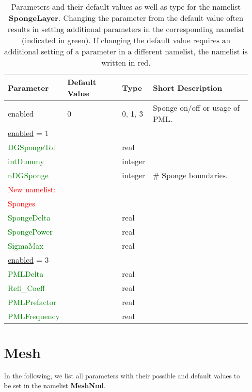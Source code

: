 \documentclass[12pt,twoside]{article}
\begin{document}
\begin{table}[H]
\caption{Parameters and their default values as well as type for the namelist \textbf{SpongeLayer}.
         Changing the parameter from the default value often results in setting additional parameters 
         in the corresponding namelist (indicated in green). 
         If changing the default value requires an additional setting of a parameter in a different namelist, 
         the namelist is written in red.}
\begin{center}
\begin{tabular}{|p{4cm}|p{2.7cm}|p{2cm}|p{4cm}|}
\hline
Parameter & Default Value & Type & Short Description \\
\hline
\hline
enabled & 0 & 0, 1, 3 & Sponge on/off or usage of PML.\\
\hdashline
\uline{enabled} = 1 & & &\\
\textcolor{green}{DGSpongeTol} &  & real & \\
\textcolor{green}{intDummy} &  & integer & \\
\textcolor{green}{nDGSponge} &  & integer & \# Sponge boundaries.\\
\textcolor{red}{New namelist:} & & &\\
\textcolor{red}{Sponges} & & &\\
\textcolor{green}{SpongeDelta} &  & real & \\
\textcolor{green}{SpongePower} &  & real & \\
\textcolor{green}{SigmaMax} &  & real & \\
\hdashline
\uline{enabled} = 3 & & &\\
\textcolor{green}{PMLDelta} & & real &\\
\textcolor{green}{Refl\_Coeff} &  & real & \\
\textcolor{green}{PMLPrefactor} &  & real & \\
\textcolor{green}{PMLFrequency} &  & real & \\
\hline
\end{tabular}
\end{center}
\label{sponge-table}
\end{table}


\newpage

\section{Mesh}
\label{sec-block-msh}

In the following, we list all parameters with their possible and default values to be set in the namelist \textbf{MeshNml}.\\
\end{document}
